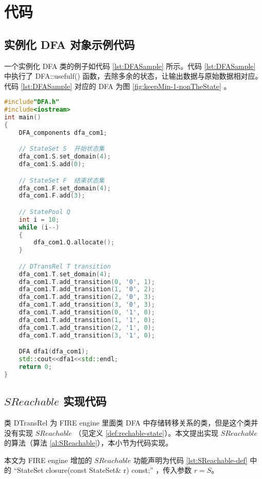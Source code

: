 \chapter{代码}

\section{实例化 DFA 对象示例代码}

一个实例化 DFA 类的例子如代码 \ref{lst:DFASample} 所示。代码 \ref{lst:DFASample} 中执行了 DFA::usefulf() 函数，去除多余的状态，让输出数据与原始数据相对应。代码 \ref{lst:DFASample} 对应的 DFA 为图 \ref{fig:keepMin-1-nonTheState} 。


\lstset{style=mystyle}
\begin{lstlisting}[language=C++,label={lst:DFASample},caption={实例化DFA示例}]
#include"DFA.h"
#include<iostream>
int main()
{
    DFA_components dfa_com1;

    // StateSet S  开始状态集
    dfa_com1.S.set_domain(4);
    dfa_com1.S.add(0);

    // StateSet F  结束状态集
    dfa_com1.F.set_domain(4);
    dfa_com1.F.add(3);

    // StatePool Q 
    int i = 10;
    while (i--)
    {
        dfa_com1.Q.allocate();
    }

    // DTransRel T transition             
    dfa_com1.T.set_domain(4);
    dfa_com1.T.add_transition(0, '0', 1);
    dfa_com1.T.add_transition(1, '0', 2);
    dfa_com1.T.add_transition(2, '0', 3);
    dfa_com1.T.add_transition(3, '0', 3);
    dfa_com1.T.add_transition(0, '1', 0);
    dfa_com1.T.add_transition(1, '1', 0);
    dfa_com1.T.add_transition(2, '1', 0);
    dfa_com1.T.add_transition(3, '1', 0);

    DFA dfa1(dfa_com1);
    std::cout<<dfa1<<std::endl;
    return 0;
}
\end{lstlisting}

\section{$SReachable$ 实现代码}\label{sec:SReachable-imp}

类 DTransRel 为 FIRE engine 里面类 DFA 中存储转移关系的类，但是这个类并没有实现 $SReachable$ （见定义 \ref{def:rechable-state}）。本文提出实现 $SReachable$ 的算法（算法 \ref{al:SReachable}），本小节为代码实现。

本文为 FIRE engine 增加的 $SReachable$ 功能声明为代码 \ref{lst:SReachable-def} 中的 “StateSet closure(const StateSet\& r) const;” ，传入参数 $r=S$。

